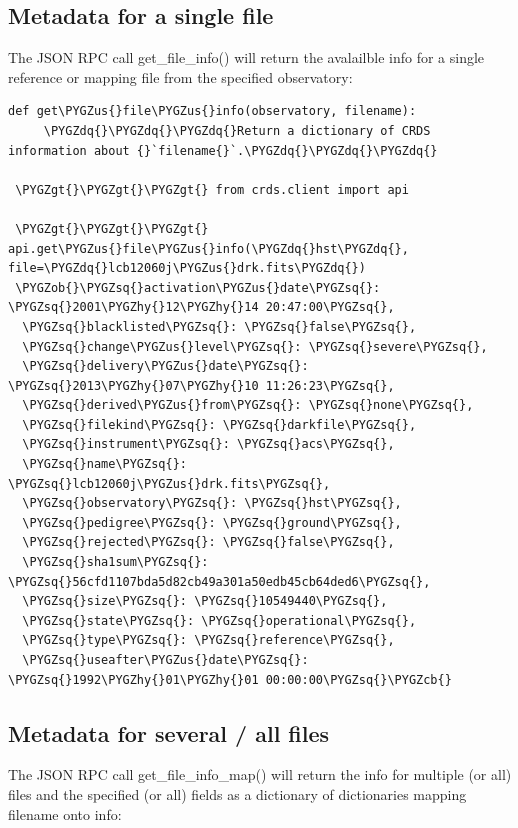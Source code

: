 \documentclass[letterpaper,10pt,english]{sphinxmanual}
\def\PYGZus{\char`\_}
\def\PYGZob{\char`\{}
\def\PYGZcb{\char`\}}
\def\PYGZgt{\char`\>}
\def\PYGZhy{\char`\-}
\def\PYGZsq{\char`\'}
\def\PYGZdq{\char`\"}
\renewcommand\PYGZsq{\textquotesingle}
\begin{document}
\subsection{Metadata for a single file}
\label{database:metadata-for-a-single-file}
The JSON RPC call get\_file\_info() will return the avalailble info for a single reference
or mapping file from the specified observatory:

\begin{Verbatim}[commandchars=\\\{\}]
def get\PYGZus{}file\PYGZus{}info(observatory, filename):
     \PYGZdq{}\PYGZdq{}\PYGZdq{}Return a dictionary of CRDS information about {}`filename{}`.\PYGZdq{}\PYGZdq{}\PYGZdq{}

 \PYGZgt{}\PYGZgt{}\PYGZgt{} from crds.client import api

 \PYGZgt{}\PYGZgt{}\PYGZgt{} api.get\PYGZus{}file\PYGZus{}info(\PYGZdq{}hst\PYGZdq{}, file=\PYGZdq{}lcb12060j\PYGZus{}drk.fits\PYGZdq{})
 \PYGZob{}\PYGZsq{}activation\PYGZus{}date\PYGZsq{}: \PYGZsq{}2001\PYGZhy{}12\PYGZhy{}14 20:47:00\PYGZsq{},
  \PYGZsq{}blacklisted\PYGZsq{}: \PYGZsq{}false\PYGZsq{},
  \PYGZsq{}change\PYGZus{}level\PYGZsq{}: \PYGZsq{}severe\PYGZsq{},
  \PYGZsq{}delivery\PYGZus{}date\PYGZsq{}: \PYGZsq{}2013\PYGZhy{}07\PYGZhy{}10 11:26:23\PYGZsq{},
  \PYGZsq{}derived\PYGZus{}from\PYGZsq{}: \PYGZsq{}none\PYGZsq{},
  \PYGZsq{}filekind\PYGZsq{}: \PYGZsq{}darkfile\PYGZsq{},
  \PYGZsq{}instrument\PYGZsq{}: \PYGZsq{}acs\PYGZsq{},
  \PYGZsq{}name\PYGZsq{}: \PYGZsq{}lcb12060j\PYGZus{}drk.fits\PYGZsq{},
  \PYGZsq{}observatory\PYGZsq{}: \PYGZsq{}hst\PYGZsq{},
  \PYGZsq{}pedigree\PYGZsq{}: \PYGZsq{}ground\PYGZsq{},
  \PYGZsq{}rejected\PYGZsq{}: \PYGZsq{}false\PYGZsq{},
  \PYGZsq{}sha1sum\PYGZsq{}: \PYGZsq{}56cfd1107bda5d82cb49a301a50edb45cb64ded6\PYGZsq{},
  \PYGZsq{}size\PYGZsq{}: \PYGZsq{}10549440\PYGZsq{},
  \PYGZsq{}state\PYGZsq{}: \PYGZsq{}operational\PYGZsq{},
  \PYGZsq{}type\PYGZsq{}: \PYGZsq{}reference\PYGZsq{},
  \PYGZsq{}useafter\PYGZus{}date\PYGZsq{}: \PYGZsq{}1992\PYGZhy{}01\PYGZhy{}01 00:00:00\PYGZsq{}\PYGZcb{}
\end{Verbatim}


\subsection{Metadata for several / all files}
\label{database:metadata-for-several-all-files}
The JSON RPC call get\_file\_info\_map() will return the info for multiple (or all) files
and the specified (or all) fields as a dictionary of dictionaries mapping filename onto info:
\end{document}
